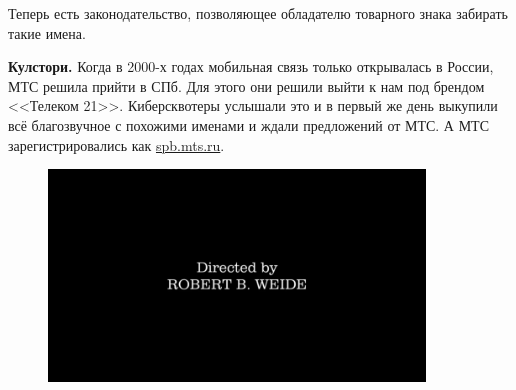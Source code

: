 Теперь есть законодательство, позволяющее обладателю товарного знака забирать такие имена.

{\bf Кулстори.} Когда в 2000-х годах мобильная связь только открывалась в России, МТС решила прийти в СПб. Для этого они решили выйти к нам под брендом <<Телеком 21>>. Киберсквотеры услышали это и в первый же день выкупили всё благозвучное с похожими именами и ждали предложений от МТС. А МТС зарегистрировались как \url{spb.mts.ru}.

\begin{figure}[h]
  \centering
  \includegraphics[width=10cm]{images/05/03}
\end{figure}

